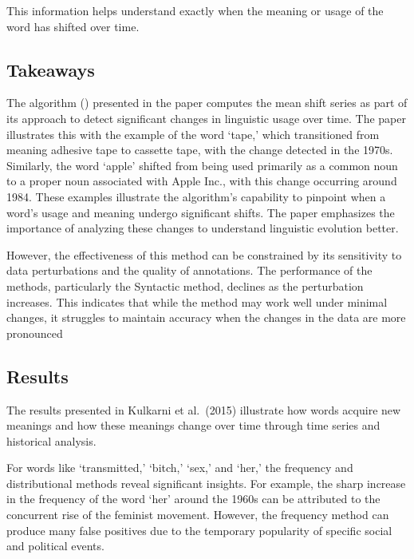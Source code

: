 This information helps understand exactly when the meaning or usage of the word has shifted over time.

\subsection{Takeaways}\label{subsec:takeaways2}
The algorithm () presented in the paper computes the mean shift series as part of its approach to detect significant changes in linguistic usage over time.
The paper illustrates this with the example of the word `tape,' which transitioned from meaning adhesive tape to cassette tape, with the change detected in the 1970s.
Similarly, the word `apple' shifted from being used primarily as a common noun to a proper noun associated with Apple Inc., with this change occurring around 1984.
These examples illustrate the algorithm’s capability to pinpoint when a word’s usage and meaning undergo significant shifts.
The paper emphasizes the importance of analyzing these changes to understand linguistic evolution better.

However, the effectiveness of this method can be constrained by its sensitivity to data perturbations and the quality of annotations.
The performance of the methods, particularly the Syntactic method, declines as the perturbation increases.
This indicates that while the method may work well under minimal changes, it struggles to maintain accuracy when the changes in the data are more pronounced

\subsection{Results} \label{subsec:kulkarni-results}

The results presented in Kulkarni et al.\ (2015) illustrate how words acquire new meanings and how these meanings change over time through time series and historical analysis.

For words like `transmitted,' `bitch,' `sex,' and `her,' the frequency and distributional methods reveal significant insights.
For example, the sharp increase in the frequency of the word `her' around the 1960s can be attributed to the concurrent rise of the feminist movement.
However, the frequency method can produce many false positives due to the temporary popularity of specific social and political events.

